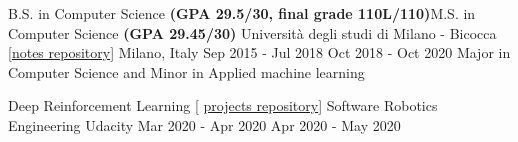 

\begin{cventries}

  \cventry
    {B.S. in Computer Science \textbf{(GPA 29.5/30, final grade 110L/110)}\linebreak M.S. in Computer Science \textbf{(GPA 29.45/30)}  } %
    {Università degli studi di Milano - Bicocca  {\tiny [\href{https://github.com/gianscarpe/unimib}{notes repository}]} } %
    {Milano, Italy} %
    {Sep 2015 - Jul 2018 \linebreak Oct 2018 - Oct 2020} %
    {Major in Computer Science and Minor in Applied machine learning
    }

  \cventry
{Deep Reinforcement Learning {\tiny [ \href{https://github.com/gianscarpe/udacity_deep_reinforcement_learning}{projects repository}]} \linebreak Software Robotics Engineering} %
{Udacity} %
{} %
{Mar 2020 - Apr 2020 \linebreak Apr 2020 - May 2020} %
{
}
\vspace{-0.7cm}
\end{cventries}
